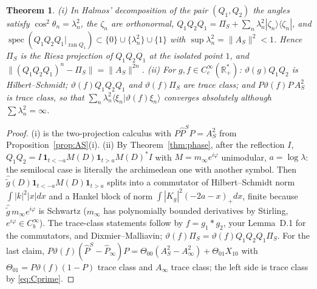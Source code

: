 \documentclass[11pt]{amsart}
\newtheorem{theorem}{Theorem}[section]
\theoremstyle{definition}
\theoremstyle{remark}
\newcommand{\R}{\mathbb R}
\newcommand{\ran}{\operatorname{ran}}
\newcommand{\Pih}{\widehat P}
\begin{document}
\begin{theorem}\label{thm:gap}
\emph{(i)} In Halmos' decomposition of the pair $(Q_1,Q_2)$ the angles satisfy $\cos^2\theta_n=\lambda_n^2$, the $\zeta_n$
are orthonormal, $Q_1Q_2Q_1=\Pi_S+\sum_n\lambda_n^2|\zeta_n\rangle\langle\zeta_n|$, and
$\operatorname{spec}(Q_1Q_2Q_1|_{\ran Q_1})\subset\{0\}\cup\{\lambda_n^2\}\cup\{1\}$ with $\sup\lambda_n^2=\|A_S\|^2<1$. Hence
$\Pi_S$ is the Riesz projection of $Q_1Q_2Q_1$ at the isolated point $1$, and
$\|(Q_1Q_2Q_1)^n-\Pi_S\|=\|A_S\|^{2n}$.
\emph{(ii)} For $g,f\in C_c^\infty(\R_+^*)$: $\vartheta(g)Q_1Q_2$ is Hilbert--Schmidt; $\vartheta(f)Q_1Q_2Q_1$ and
$\vartheta(f)\Pi_S$ are trace class; and $P\vartheta(f)P\,A_S^2$ is trace class, so that
$\sum_n\lambda_n^2\langle\xi_n|\vartheta(f)\xi_n\rangle$ converges absolutely although $\sum\lambda_n^2=\infty$.
\end{theorem}
\begin{proof}
(i) is the two-projection calculus \cite{Halmos1969} with $P\Pih^SP=A_S^2$ from Proposition~\ref{prop:AS}(i).
(ii) By Theorem~\ref{thm:phase}, after the reflection $I$, $Q_1Q_2=I\,\mathbf 1_{t<-a}M(D)\mathbf 1_{t>a}M(D)^*I$ with
$M=m_\infty e^{i\varphi}$ unimodular, $a=\log\lambda$: the semilocal case is literally the archimedean one with another
symbol. Then $\widehat{\tilde g}(D)\mathbf 1_{t<-a}M(D)\mathbf 1_{t>a}$ splits into a commutator of Hilbert--Schmidt norm
$\int|k|^2|x|dx$ and a Hankel block of norm $\int|K_g|^2(-2a-x)_+dx$, finite because $\widehat{\tilde g}\,m_\infty e^{i\varphi}$ is
Schwartz ($m_\infty$ has polynomially bounded derivatives by Stirling, $e^{i\varphi}\in C_b^\infty$). The trace-class
statements follow by $f=g_1*g_2$, your Lemma~D.1 for the commutators, and Dixmier--Malliavin;
$\vartheta(f)\Pi_S=\vartheta(f)Q_1Q_2Q_1\Pi_S$. For the last claim, $P\vartheta(f)(\Pih^S-\Pih_\infty)P=\Theta_{00}(A_S^2-A_\infty^2)+\Theta_{01}X_{10}$
with $\Theta_{01}=P\vartheta(f)(1-P)$ trace class and $A_\infty$ trace class; the left side is trace class by \eqref{eq:Cprime}.
\end{proof}
\end{document}
